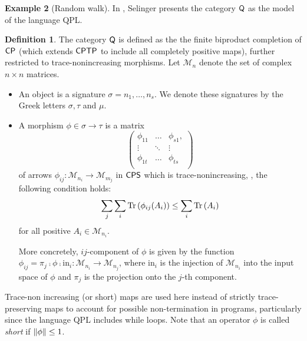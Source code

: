 \documentclass[10pt,a4paper]{amsart}
\theoremstyle{definition}
\newtheorem{definition}{Definition}[section]
\theoremstyle{definition}
\newtheorem{example}[definition]{Example}
\theoremstyle{definition}
\theoremstyle{definition}
\theoremstyle{definition}
\theoremstyle{definition}
\begin{document}
\begin{example}[Random walk]
\begin{comment}
\todo[inline]{Explicar melhor o op de Dephasing}

\end{comment}




In \cite{selinger04}, Selinger presents the category $\mathsf{Q}$ as the model of the language QPL.  

\begin{definition} \label{def:catQ}
  The category $\mathsf{Q}$ is defined as the the finite biproduct completion of $\mathsf{CP}$ (which extends $\mathsf{CPTP}$ to include all completely positive maps),  further restricted to trace-nonincreasing morphisms. Let  $\mathcal{M}_n$ denote the set of complex $n\times n$ matrices.
  \begin{itemize}
    \item An object is a signature $\sigma= n_1, \ldots, n_s$. We denote these signatures by the Greek letters $\sigma, \tau$ and $\mu$.
    \item A morphism $\phi \in \sigma \to \tau $ is a matrix
    $$\begin{pmatrix}
      \phi_{11} & \ldots & \phi_{s1}, \\
      \vdots & \ddots  & \vdots \\
      \phi_{1t} & \ldots & \phi_{ts} \\
    \end{pmatrix}$$
    of arrows $\phi_{ij}: \mathcal{M}_{n_i} \rightarrow \mathcal{M}_{m_j}$ in $\mathsf{CPS}$ which is trace-nonincreasing, \ie, the following condition holds:
    $$ \sum_j \sum_i \text{Tr} \left(\phi_{ij} (A_i)\right)   \leq  \sum_i \text{Tr} \left(A_i\right) $$
   for all positive $A_i \in \mathcal{M}_{n_i}$.

    More concretely, $ij$-component of $\phi$ is given by the function $\phi_{ij} = \pi_{j} \comp \phi \comp \mathrm{in}_{i} : \mathcal{M}_{n_i} \rightarrow \mathcal{M}_{n_j} $, where $\mathrm{in}_{i}$ is the injection of  $\mathcal{M}_{n_i}$ into the input space of $\phi$ and  $\pi_{j}$ is the projection onto the $j$-th component.
  \end{itemize}
\end{definition}


 Trace-non increasing (or short) maps are used here instead of strictly trace-preserving maps to account for possible non-termination in programs, particularly since the language  QPL includes while loops. Note that an operator $ \phi $ is called \emph{short} if $\left\lVert \phi \right\rVert \leq 1$.



\end{example}
\end{document}
